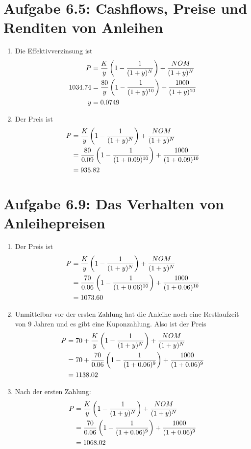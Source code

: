 \documentclass{article}
\begin{document}
	\section*{Aufgabe 6.5: Cashflows, Preise und Renditen von Anleihen}
	\begin{enumerate}[label=(\alph*)]
		\item Die Effektivverzinsung ist
		\begin{align}
			P &= \frac{K}{y}\left(1-\frac{1}{(1+y)^N}\right) + \frac{NOM}{(1+y)^N} \notag \\
			1034.74 &= \frac{80}{y}\left(1-\frac{1}{(1+y)^{10}}\right) + \frac{1000}{(1+y)^{10}} \notag \\
			y &= 0.0749 \notag
		\end{align}
		\item Der Preis ist
		\begin{align}
			P &= \frac{K}{y}\left(1-\frac{1}{(1+y)^N}\right) + \frac{NOM}{(1+y)^N} \notag \\
			&= \frac{80}{0.09}\left(1-\frac{1}{(1+0.09)^{10}}\right) + \frac{1000}{(1+0.09)^{10}} \notag \\
			&= 935.82 \notag
		\end{align}
	\end{enumerate}
	
	\section*{Aufgabe 6.9: Das Verhalten von Anleihepreisen}
	\begin{enumerate}[label=(\alph*)]
		\item Der Preis ist
		\begin{align}
			P &= \frac{K}{y}\left(1-\frac{1}{(1+y)^N}\right) + \frac{NOM}{(1+y)^N} \notag \\
			&= \frac{70}{0.06}\left(1-\frac{1}{(1+0.06)^{10}}\right) + \frac{1000}{(1+0.06)^{10}} \notag\\
			&= 1073.60 \notag
		\end{align}
		\item Unmittelbar vor der ersten Zahlung hat die Anleihe noch eine Restlaufzeit von 9 Jahren und es gibt eine Kuponzahlung. Also ist der Preis
		\begin{align}
			P &= 70 + \frac{K}{y}\left(1-\frac{1}{(1+y)^N}\right) + \frac{NOM}{(1+y)^N} \notag \\
			&= 70 + \frac{70}{0.06}\left(1-\frac{1}{(1+0.06)^{9}}\right) + \frac{1000}{(1+0.06)^{9}} \notag \\
			&= 1138.02 \notag
		\end{align}
		\item Nach der ersten Zahlung:
		\begin{align}
			P &= \frac{K}{y}\left(1-\frac{1}{(1+y)^N}\right) + \frac{NOM}{(1+y)^N} \notag \\
			&= \frac{70}{0.06}\left(1-\frac{1}{(1+0.06)^{9}}\right) + \frac{1000}{(1+0.06)^{9}} \notag \\
			&= 1068.02 \notag
		\end{align}
	\end{enumerate}
\end{document}
